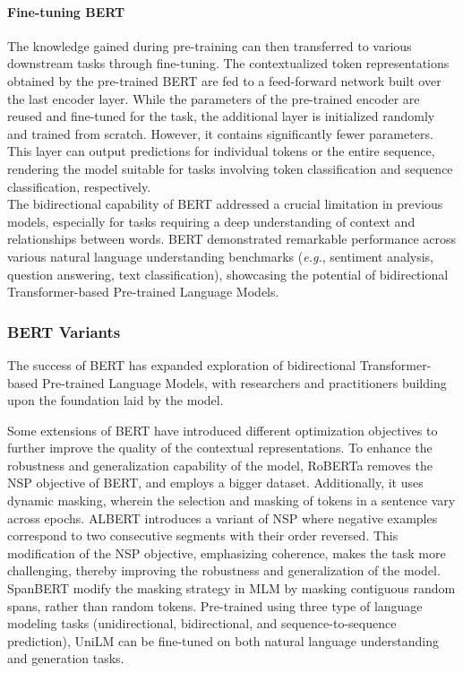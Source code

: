 \paragraph{Fine-tuning BERT}

The knowledge gained during pre-training can then transferred to various downstream tasks through fine-tuning. The contextualized token representations obtained by the pre-trained \ac{BERT} are fed to a feed-forward network built over the last encoder layer. While the parameters of the pre-trained encoder are reused and fine-tuned for the task, the additional layer is initialized randomly and trained from scratch. However, it contains significantly fewer parameters. This layer can output predictions for individual tokens or the entire sequence, rendering the model suitable for tasks involving token classification and sequence classification, respectively. \\

The bidirectional capability of \ac{BERT} addressed a crucial limitation in previous models, especially for tasks requiring a deep understanding of context and relationships between words. \ac{BERT} demonstrated remarkable performance across various natural language understanding benchmarks (\textit{e.g.}, sentiment analysis, question answering, text classification), showcasing the potential of bidirectional Transformer-based Pre-trained Language Models.
 
\subsubsection{BERT Variants}

The success of \ac{BERT} has expanded exploration of bidirectional Transformer-based Pre-trained Language Models, with researchers and practitioners building upon the foundation laid by the model. 

Some extensions of \ac{BERT} have introduced different optimization objectives to further improve the quality of the contextual representations. To enhance the robustness and generalization capability of the model, \ac{RoBERTa} \citep{liu2019roberta} removes the \ac{NSP} objective of \ac{BERT}, and employs a bigger dataset. Additionally, it uses dynamic masking, wherein the selection and masking of tokens in a sentence vary across epochs. \ac{ALBERT} \citep{lan2019albert} introduces a variant of \ac{NSP} where negative examples correspond to two consecutive segments with their order reversed. This modification of the \ac{NSP} objective, emphasizing coherence, makes the task more challenging, thereby improving the robustness and generalization of the model. SpanBERT \citep{joshi2020spanbert} modify the masking strategy in \ac{MLM} by masking contiguous random spans, rather than random tokens. Pre-trained using three type of language modeling tasks (unidirectional, bidirectional, and sequence-to-sequence prediction), UniLM \citep{dong2019unified} can be fine-tuned on both natural language understanding and generation tasks. 

